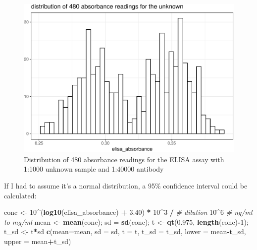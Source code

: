 \documentclass[
]{article}
\newenvironment{Shaded}{\begin{snugshade}}{\end{snugshade}}
\newcommand{\CommentTok}[1]{\textcolor[rgb]{0.56,0.35,0.01}{\textit{#1}}}
\newcommand{\DataTypeTok}[1]{\textcolor[rgb]{0.13,0.29,0.53}{#1}}
\newcommand{\DecValTok}[1]{\textcolor[rgb]{0.00,0.00,0.81}{#1}}
\newcommand{\FloatTok}[1]{\textcolor[rgb]{0.00,0.00,0.81}{#1}}
\newcommand{\KeywordTok}[1]{\textcolor[rgb]{0.13,0.29,0.53}{\textbf{#1}}}
\newcommand{\NormalTok}[1]{#1}
\newcommand{\OperatorTok}[1]{\textcolor[rgb]{0.81,0.36,0.00}{\textbf{#1}}}
\newcommand{\StringTok}[1]{\textcolor[rgb]{0.31,0.60,0.02}{#1}}
\begin{document}
\begin{figure}
\includegraphics[width=1\linewidth]{2020-03-08-immunoassay-in-silico_files/figure-latex/elisa-abs-dist-1} \caption{Distribution of 480 absorbance readings for the ELISA assay with 1:1000 unknown sample and 1:40000 antibody}\label{fig:elisa-abs-dist}
\end{figure}

If I had to assume it's a normal distribution, a 95\% confidence interval could be calculated:

\begin{Shaded}
\begin{Highlighting}[]
\NormalTok{conc <-}\StringTok{ }\DecValTok{10}\OperatorTok{^}\NormalTok{(}\KeywordTok{log10}\NormalTok{(elisa_absorbance) }\OperatorTok{+}\StringTok{ }\FloatTok{3.40}\NormalTok{) }\OperatorTok{*}
\StringTok{                }\DecValTok{10}\OperatorTok{^}\DecValTok{3} \OperatorTok{/}\StringTok{ }\CommentTok{# dilution}
\StringTok{                }\DecValTok{10}\OperatorTok{^}\DecValTok{6} \CommentTok{# ng/ml to mg/ml}
\NormalTok{mean <-}\StringTok{ }\KeywordTok{mean}\NormalTok{(conc); sd =}\StringTok{ }\KeywordTok{sd}\NormalTok{(conc);}
\NormalTok{t <-}\StringTok{ }\KeywordTok{qt}\NormalTok{(}\FloatTok{0.975}\NormalTok{, }\KeywordTok{length}\NormalTok{(conc)}\OperatorTok{-}\DecValTok{1}\NormalTok{); t_sd <-}\StringTok{ }\NormalTok{t}\OperatorTok{*}\NormalTok{sd}
\KeywordTok{c}\NormalTok{(}\DataTypeTok{mean=}\NormalTok{mean, }\DataTypeTok{sd =}\NormalTok{ sd, }\DataTypeTok{t =}\NormalTok{ t, }\DataTypeTok{t_sd =}\NormalTok{ t_sd, }\DataTypeTok{lower =}\NormalTok{ mean}\OperatorTok{-}\NormalTok{t_sd, }\DataTypeTok{upper =}\NormalTok{ mean}\OperatorTok{+}\NormalTok{t_sd)}
\end{Highlighting}
\end{Shaded}
\end{document}
